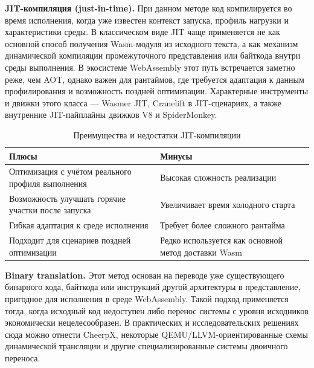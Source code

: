 \documentclass[12pt, oneside]{book}
\begin{document}
    \quad \textbf{JIT-компиляция (just-in-time).} При данном методе код компилируется во время исполнения, когда уже известен контекст запуска, профиль нагрузки и характеристики среды. В классическом виде JIT чаще применяется не как основной способ получения Wasm-модуля из исходного текста, а как механизм динамической компиляции промежуточного представления или байткода внутри среды выполнения. В экосистеме WebAssembly этот путь встречается заметно реже, чем AOT, однако важен для рантаймов, где требуется адаптация к данным профилирования и возможность поздней оптимизации. Характерные инструменты и движки этого класса --- Wasmer JIT, Cranelift в JIT-сценариях, а также внутренние JIT-пайплайны движков V8 и SpiderMonkey.

\begin{table}[htbp]
\centering
\scriptsize
\renewcommand{\arraystretch}{1.15}
\begin{tabular}{|p{5.8cm}|p{5.8cm}|}
\hline
\textbf{Плюсы} & \textbf{Минусы} \\
\hline
Оптимизация с учётом реального профиля выполнения & Высокая сложность реализации \\
\hline
Возможность улучшать горячие участки после запуска & Увеличивает время холодного старта \\
\hline
Гибкая адаптация к среде исполнения & Требует более сложного рантайма \\
\hline
Подходит для сценариев поздней оптимизации & Редко используется как основной метод доставки Wasm \\
\hline
\end{tabular}
\caption{Преимущества и недостатки JIT-компиляции}
\label{tab:jit_pros_cons}
\end{table}

    \quad \textbf{Binary translation.} Этот метод основан на переводе уже существующего бинарного кода, байткода или инструкций другой архитектуры в представление, пригодное для исполнения в среде WebAssembly. Такой подход применяется тогда, когда исходный код недоступен либо перенос системы с уровня исходников экономически нецелесообразен. В практических и исследовательских решениях сюда можно отнести CheerpX, некоторые QEMU/LLVM-ориентированные схемы динамической трансляции и другие специализированные системы двоичного переноса.
\end{document}
